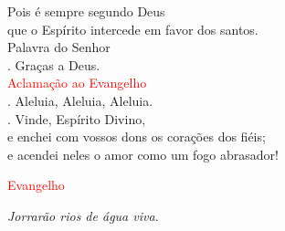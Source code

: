 \documentclass{book}
\begin{document}
\begin{flushleft}
    Pois é sempre segundo Deus \\
    que o Espírito intercede em favor dos santos.
    \vspace{.1cm} \\
    Palavra do Senhor \\
    {\color{red} \Rbar.} Graças a Deus.
    \vspace{.2cm} \\
    \textcolor{red}{Aclamação ao Evangelho}
    \vspace{.1cm} \\
    {\color{red} \Rbar.} Aleluia, Aleluia, Aleluia. \\
    {\color{red} \Vbar.} Vinde, Espírito Divino, \\
    e enchei com vossos dons os corações dos fiéis; \\
    e acendei neles o amor como um fogo abrasador!

\end{flushleft}

\begin{center}

    \textcolor{red}{Evangelho}

\end{center}

\begin{flushright}
    \textit{Jorrarão rios de água viva.}
\end{flushright}
\end{document}
